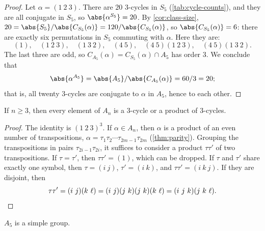 \begin{proof}
	Let \(\alpha = (1\ 2\ 3)\). There are \(20\) \(3\)-cycles in \(S_5\)
	(\autoref{tab:cycle-counts}), and they are all conjugate in \(S_5\), so
	\(\abs{\alpha^{S_5}} = 20\). By \autoref{cor:class-size},
	\(20 = \abs{S_5}/\abs{C_{S_5}(\alpha)} = 120/\abs{C_{S_5}(\alpha)}\), so
	\(\abs{C_{S_5}(\alpha)} = 6\): there are exactly six permutations in \(S_5\) commuting
	with \(\alpha\). Here they are:
	\[
		(1), \quad (1\ 2\ 3), \quad (1\ 3\ 2), \quad (4\ 5), \quad
		(4\ 5)(1\ 2\ 3), \quad (4\ 5)(1\ 3\ 2).
	\]
	The last three are odd, so \(C_{A_5}(\alpha) = C_{S_5}(\alpha) \cap A_5\) has order
	\(3\). We conclude that
	\[
		\abs{\alpha^{A_5}} = \abs{A_5}/\abs{C_{A_5}(\alpha)} = 60/3 = 20;
	\]
	that is, all twenty \(3\)-cycles are conjugate to \(\alpha\) in \(A_5\), hence to each
	other.
\end{proof}

\begin{lemma}\label{lem:products-of-3-cycles}
	If \(n \geq 3\), then every element of \(A_n\) is a \(3\)-cycle or a product of
	\(3\)-cycles.
\end{lemma}

\begin{proof}
	The identity is \((1\ 2\ 3)^3\). If \(\alpha \in A_n\), then \(\alpha\) is a product of
	an even number of transpositions, \(\alpha = \tau_1\tau_2\cdots\tau_{2m-1}\tau_{2m}\)
	(\autoref{thm:parity}). Grouping the transpositions in pairs \(\tau_{2i-1}\tau_{2i}\),
	it suffices to consider a product \(\tau\tau'\) of two transpositions. If
	\(\tau = \tau'\), then \(\tau\tau' = (1)\), which can be dropped. If \(\tau\) and
	\(\tau'\) share exactly one symbol, then \(\tau = (i\ j)\), \(\tau' = (i\ k)\), and
	\(\tau\tau' = (i\ k\ j)\). If they are disjoint, then
	\[
		\tau\tau' = (i\ j)(k\ \ell) = (i\ j)(j\ k)(j\ k)(k\ \ell) = (i\ j\ k)(j\ k\ \ell).
		\qedhere
	\]
\end{proof}

\begin{theorem}\label{thm:A5-simple}
	\(A_5\) is a simple group.
\end{theorem}

